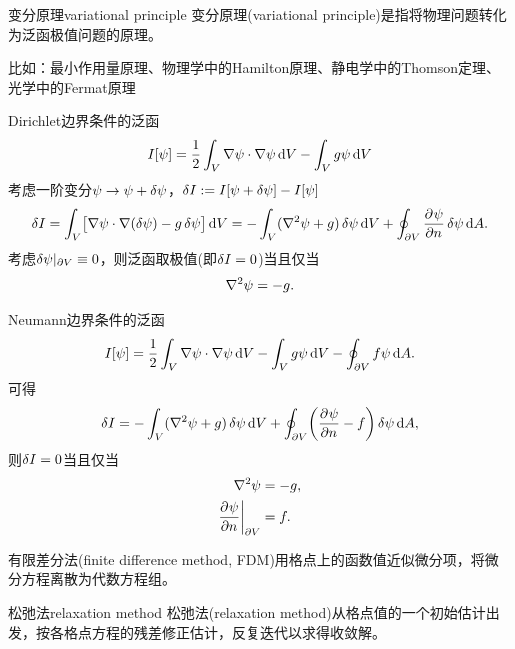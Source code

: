 \begin{definition}{变分原理}{variational principle}
    变分原理(variational principle)是指将物理问题转化为泛函极值问题的原理。

    比如：最小作用量原理、物理学中的Hamilton原理、静电学中的Thomson定理、光学中的Fermat原理
\end{definition}
Dirichlet边界条件的泛函
\begin{equation}
    I[\psi] = \frac12\int_V\nabla\psi \cdot \nabla\psi\mathop{}\!\mathrm{d} V - \int_Vg\psi\mathop{}\!\mathrm{d} V
\end{equation}
考虑一阶变分$\psi \to \psi + \mathop{}\!\delta\psi$，$\mathop{}\!\delta I := I[\psi + \mathop{}\!\delta\psi] - I[\psi]$
\[
    \vd I = \int_V\bigb{\grad\psi \cdot \grad(\vd\psi) - g\vd\psi}\d V = -\int_V(\laplacian\psi + g)\vd\psi\d V + \oint_{\p V}\pv\psi n\vd\psi\d A.
\]
考虑${\mathop{}\!\delta\psi}\rvert_{\partial V} \equiv 0$，则泛函取极值(即$\mathop{}\!\delta I = 0$)当且仅当
\begin{equation}
    \nabla^2\psi = -g.
\end{equation}

Neumann边界条件的泛函
\begin{equation}
    I[\psi] = \frac12\int_V\nabla\psi \cdot \nabla\psi\mathop{}\!\mathrm{d} V - \int_Vg\psi\mathop{}\!\mathrm{d} V - \oint_{\partial V}f\psi\mathop{}\!\mathrm{d} A.
\end{equation}
可得 
\[
    \mathop{}\!\delta I = -\int_V(\nabla^2\psi + g)\mathop{}\!\delta\psi\mathop{}\!\mathrm{d} V + \oint_{\partial V}\biggl(\frac{\partial^{}\psi}{\partial{n}^{}} - f\biggr)\mathop{}\!\delta\psi\mathop{}\!\mathrm{d} A,
\]
则$\mathop{}\!\delta I = 0$当且仅当
\begin{subequations}
    \begin{align}
        \nabla^2\psi &= -g,\\
        {\frac{\partial^{}\psi}{\partial{n}^{}}}\biggr\rvert_{\partial V} &= f.
    \end{align}
\end{subequations}


有限差分法(finite difference method, FDM)用格点上的函数值近似微分项，将微分方程离散为代数方程组。
\begin{definition}
    {松弛法}{relaxation method}
    松弛法(relaxation method)从格点值的一个初始估计出发，按各格点方程的残差修正估计，反复迭代以求得收敛解。
\end{definition}

